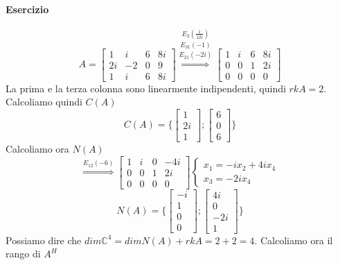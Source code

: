 \documentclass[a4paper, 10pt]{article}
\begin{document}
	\paragraph*{Esercizio}
	\[ A = \begin{bmatrix} 1 & i & 6 & 8i \\ 2i & -2 & 0 & 9 \\ 1 & i & 6 & 8i \end{bmatrix} 
		\stackrel{E_2(\frac{1}{12i})}{\stackrel{E_{31}(-1)}{\stackrel{E_{21}(-2i)}{\Longrightarrow}}}
		\begin{bmatrix} 1 & i & 6 & 8i \\ 0 & 0 & 1 & 2i \\ 0 & 0 & 0 & 0 \end{bmatrix}
	\] La prima e la terza colonna sono linearmente indipendenti, quindi $rkA = 2$. Calcoliamo quindi $C(A)$
	\[ C(A) = \lbrace \begin{bmatrix} 1 \\ 2i \\ 1 \end{bmatrix} ; \begin{bmatrix} 6 \\ 0 \\ 6 \end{bmatrix} \rbrace \]
	Calcoliamo ora $N(A)$
	\[ \stackrel{E_{12}(-6)}{\Longrightarrow}\begin{bmatrix}
	1 & i & 0 & -4i \\ 0 & 0 & 1 & 2i \\ 0 & 0 & 0 & 0 
	\end{bmatrix} \begin{cases} x_1 = -ix_2 + 4ix_4 \\ x_3 = -2ix_4 \end{cases} \]
	\[ N(A) = \lbrace \begin{bmatrix} -i \\ 1 \\ 0 \\ 0 \end{bmatrix} ;
			 \begin{bmatrix} 4i \\ 0 \\ -2i \\ 1 \end{bmatrix} \rbrace
	 \]
	 Possiamo dire che $dim\mathbb{C}^4 = dimN(A) + rkA = 2 + 2 = 4$. Calcoliamo ora il rango di $A^H$
\end{document}
